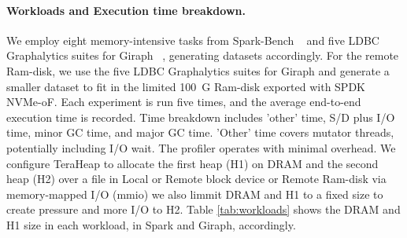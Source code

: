 \paragraph{Workloads and Execution time breakdown.} We employ eight memory-intensive tasks from Spark-Bench ~\cite{spark} and five LDBC Graphalytics suites for Giraph ~\cite{giraph}, generating datasets accordingly. For the remote Ram-disk, we use the five LDBC Graphalytics suites for Giraph and generate a smaller dataset to fit in the limited \SI{100}{G} Ram-disk exported with SPDK NVMe-oF. Each experiment is run five times, and the average end-to-end execution time is recorded. Time breakdown includes 'other' time, S/D plus I/O time, minor GC time, and major GC time. 'Other' time covers mutator threads, potentially including I/O wait. The profiler operates with minimal overhead. We configure TeraHeap to allocate the first heap (H1) on DRAM and the second heap (H2) over a file in Local or Remote block device or Remote Ram-disk via memory-mapped I/O (mmio) we also limmit DRAM and H1 to a fixed size to create pressure and more I/O to H2. Table \ref{tab:workloads} shows the DRAM and H1 size in each workload, in Spark and Giraph, accordingly. 
